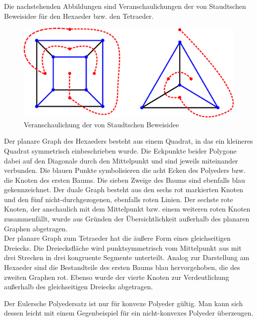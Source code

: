 Die nachstehenden Abbildungen sind Veranschaulichungen der von Staudtschen Beweisidee für den Hexaeder bzw. den Tetraeder.\\ 
\begin{figure}[H]
\centering
\includegraphics[width=0.7\linewidth]{./grafiken/duale_graphen}
\caption{Veranschaulichung der von Staudtschen Beweisidee}
\label{fig:duale_graphen}
\end{figure}

Der planare Graph des Hexaeders besteht aus einem Quadrat, in das ein kleineres Quadrat symmetrisch einbeschrieben wurde. Die Eckpunkte beider Polygone dabei auf den Diagonale durch den Mittelpunkt und sind jeweils miteinander verbunden. 
Die blauen Punkte symbolisieren die acht Ecken des Polyeders bzw. die Knoten des ersten Baums. Die sieben Zweige des Baums sind ebenfalls blau gekennzeichnet. Der duale Graph besteht aus den sechs rot markierten Knoten und den fünf  nicht-durchgezogenen, ebenfalls roten Linien. Der sechste rote Knoten, der anschaulich mit dem Mittelpunkt bzw. einem weiteren roten Knoten zusammenfällt, wurde aus Gründen der Übersichtlichkeit außerhalb des planaren Graphen abgetragen.\\
Der planare Graph zum Tetraeder hat die äußere Form eines gleichseitigen Dreiecks. Die Dreiecksfläche wird punktsymmetrisch vom Mittelpunkt aus mit drei Strecken in drei kongruente Segmente unterteilt. Analog zur Darstellung am Hexaeder sind die Bestandteile des ersten Baums blau hervorgehoben, die des zweiten Graphen rot. Ebenso wurde der vierte Knoten zur Verdeutlichung außerhalb des gleichseitigen Dreiecks abgetragen. \\
\begin{bem} 
Der Eulersche Polyedersatz ist nur für konvexe Polyeder gültig. Man kann sich dessen leicht mit einem Gegenbeispiel für ein nicht-konvexes Polyeder überzeugen.
\end{bem}


